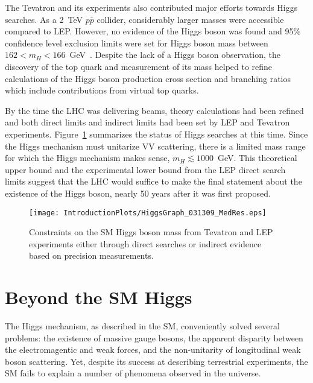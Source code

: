 The Tevatron
and its experiments also contributed major efforts towards Higgs
searches.  As a 2~TeV $p\bar{p}$ collider, considerably larger 
masses were accessible compared to LEP.  However, no evidence of 
the 
Higgs boson  was found and 95\% confidence level exclusion limits
were set for Higgs boson mass between
$162<m_H<166$~GeV~\cite{Aaltonen:2010yv}.  
Despite the lack of a Higgs boson observation, the discovery of
the top quark and measurement of its mass helped
to refine calculations of the Higgs boson production cross section
and branching ratios which include contributions from virtual
top quarks.

By the time the LHC was delivering beams, theory
calculations had been refined and both direct limits and indirect
limits had been set by LEP and Tevatron experiments.
Figure~\ref{fig:HiggsConstraints} summarizes the 
status of Higgs searches at this time.  Since the Higgs mechanism
must unitarize VV scattering, there is a limited mass range for 
which the Higgs mechanism makes sense, $m_H\lesssim1000$~GeV.
This theoretical upper bound and the experimental lower bound from
the LEP direct search limits suggest that the LHC would suffice
to make the final statement about the existence of the Higgs
boson, nearly 50 years after it was first proposed.  

\begin{figure}
\begin{center}
\texttt{[image: IntroductionPlots/HiggsGraph\_031309\_MedRes.eps]}
\caption{Constraints on the SM Higgs boson mass from Tevatron and 
LEP experiments either through direct searches or indirect 
evidence based on precision measurements. 
}
\label{fig:HiggsConstraints}
\end{center}
\end{figure}

\section{Beyond the SM Higgs}

The Higgs mechanism, as described in the SM, conveniently solved 
several problems:
the existence of massive gauge bosons, the apparent disparity
between the electromagentic and weak forces, and the non-unitarity
of longitudinal weak boson scattering. Yet, despite its success
at describing terrestrial 
experiments, the SM fails to explain a number of phenomena 
observed in the universe.
  

